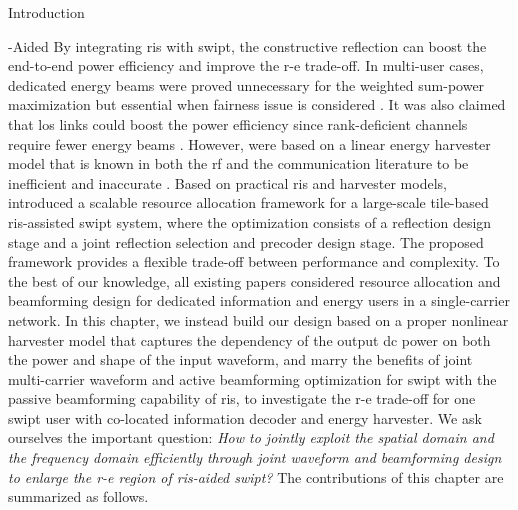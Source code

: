 \begin{section}{Introduction}
	\begin{subsection}{-Aided }
		By integrating \gls{ris} with \gls{swipt}, the constructive reflection can boost the end-to-end power efficiency and improve the \gls{r-e} trade-off. In multi-user cases, dedicated energy beams were proved unnecessary for the weighted sum-power maximization \cite{Wu2020b} but essential when fairness issue is considered \cite{Tang2019}. It was also claimed that \gls{los} links could boost the power efficiency since rank-deficient channels require fewer energy beams \cite{Wu2020a}. However, \cite{Wu2020b,Tang2019,Wu2020a} were based on a linear energy harvester model that is known in both the \gls{rf} and the communication literature to be inefficient and inaccurate \cite{Clerckx2019,Trotter2009,Clerckx2018,Clerckx2016a,Kim2019,Kim2020a,Kim2021,Clerckx2017,Kim2017,Clerckx2018b,Varasteh2020,Varasteh2019d,Varasteh2020a}. Based on practical \gls{ris} and harvester models, \cite{Xu2021c} introduced a scalable resource allocation framework for a large-scale tile-based \gls{ris}-assisted \gls{swipt} system, where the optimization consists of a reflection design stage and a joint reflection selection and precoder design stage. The proposed framework provides a flexible trade-off between performance and complexity. To the best of our knowledge, all existing papers considered resource allocation and beamforming design for dedicated information and energy users in a single-carrier network. In this chapter, we instead build our design based on a proper nonlinear harvester model that captures the dependency of the output \gls{dc} power on both the power and shape of the input waveform, and marry the benefits of joint multi-carrier waveform and active beamforming optimization for \gls{swipt} with the passive beamforming capability of \gls{ris}, to investigate the \gls{r-e} trade-off for one \gls{swipt} user with co-located information decoder and energy harvester. We ask ourselves the important question: \emph{How to jointly exploit the spatial domain and the frequency domain efficiently through joint waveform and beamforming design to enlarge the \gls{r-e} region of \gls{ris}-aided \gls{swipt}?} The contributions of this chapter are summarized as follows.


\end{subsection}
\end{section}
